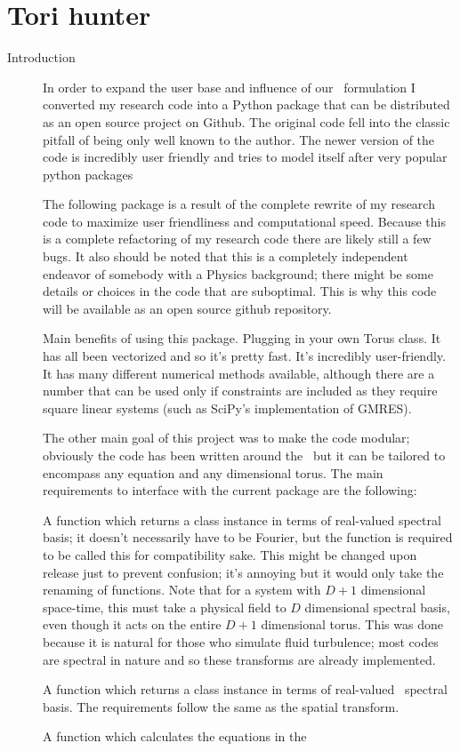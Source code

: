 

\chapter{Tori hunter}
\label{chap:torihunter}

\begin{description}
\item[Introduction]
In order to expand the user base and influence of our \spt\ formulation
I converted my research code into a Python package that can be distributed
as an open source project on Github. The original code fell into the classic
pitfall of being only well known to the author. The newer version of the code
is incredibly user friendly and tries to model itself after very popular
python packages

The following package is a result of the complete rewrite of my
research code to maximize user friendliness and computational speed.
Because this is a complete refactoring of my research code there
are likely still a few bugs. It also should be noted that this is
a completely independent endeavor of somebody with a Physics background;
there might be some details or choices in the code that are suboptimal.
This is why this code will be available as an open source github repository.

Main benefits of using this package. Plugging in your own Torus class.
It has all been vectorized and so it's pretty fast. It's incredibly user-friendly.
It has many different numerical methods available, although there are
a number that can be used only if constraints are included as they
require square linear systems (such as SciPy's implementation of GMRES).

The other main goal of this project was to make the code modular; obviously
the code has been written around the \KSe\ but it can be tailored to
encompass any equation and any dimensional torus. The main
requirements to interface with the current package are the
following:

A function which returns a class instance in terms of real-valued spectral basis; it doesn't
necessarily have to be Fourier, but the function is required to be called this for compatibility sake.
This might be changed upon release just to prevent confusion; it's annoying but it would only
take the renaming of functions. Note that for a system with $D+1$ dimensional space-time, this
must take a physical field to $D$ dimensional spectral basis, even though it acts on the entire
$D+1$ dimensional torus. This was done because it is natural for those who simulate fluid turbulence;
most codes are spectral in nature and so these transforms are already implemented.

A function which returns a class instance in terms of real-valued \spt\ spectral basis. The requirements
follow the same as the spatial transform.

A function which calculates the equations in the \spt\ \Fcs\

\end{description}
